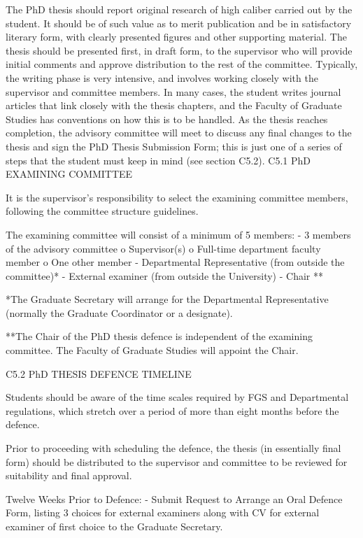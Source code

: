 The PhD thesis should report original research of high caliber carried out by the student. It should be of such value as to merit publication and be in satisfactory literary form, with clearly presented figures and other supporting material. The thesis should be presented first, in draft form, to the supervisor who will provide initial comments and approve distribution to the rest of the committee. Typically, the writing phase is very intensive, and involves working closely with the supervisor and committee members. In many cases, the student writes journal articles that link closely with the thesis chapters, and the Faculty of Graduate Studies has conventions on how this is to be handled. As the thesis reaches completion, the advisory committee will meet to discuss any final changes to the thesis and sign the PhD Thesis Submission Form; this is just one of a series of steps that the student must keep in mind (see section C5.2).
C5.1	PhD EXAMINING COMMITTEE
 

It is the supervisor’s responsibility to select the examining committee members, following the committee structure guidelines.

The examining committee will consist of a minimum of 5 members:
-	3 members of the advisory committee
o	Supervisor(s)
o	Full-time department faculty member
o	One other member
-	Departmental Representative (from outside the committee)*
-	External examiner (from outside the University)
-	Chair **

*The Graduate Secretary will arrange for the Departmental Representative (normally the Graduate Coordinator or a designate).

**The Chair of the PhD thesis defence is independent of the examining committee. The Faculty of Graduate Studies will appoint the Chair.

C5.2	PhD THESIS DEFENCE TIMELINE

Students should be aware of the time scales required by FGS and Departmental regulations, which stretch over a period of more than eight months before the defence.

Prior to proceeding with scheduling the defence, the thesis (in essentially final form) should be distributed to the supervisor and committee to be reviewed for suitability and final approval.

Twelve Weeks Prior to Defence:
-	Submit Request to Arrange an Oral Defence Form, listing 3 choices for external examiners along with CV for external examiner of first choice to the Graduate Secretary.

